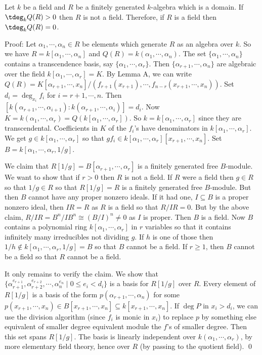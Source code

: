 \begin{lem}[Lemma B]
Let $k$ be a field and $R$ be a finitely generated $k$-algebra which is a domain. If $\tdeg_k Q(R)>0$ then $R$ is not a field. Therefore, if $R$ is a field then $\tdeg_k Q(R)=0$. 
\end{lem}

\noindent Proof: Let $\alpha_1,\cdots,\alpha_n \in R$ be elements which generate $R$ as an algebra over $k$. So we have $R=k[\alpha_1,\cdots,\alpha_n]$ and $Q(R)=k(\alpha_1,\cdots,\alpha_n)$. The set $\{\alpha_1,\cdots,\alpha_n\}$ contains a transcendence basis, say $\{\alpha_1,\cdots,\alpha_r\}$. Then $\{\alpha_{r+1},\cdots,\alpha_n\}$ are algebraic over the field $k[\alpha_1,\cdots,\alpha_r]=K$. By Lemma A, we can write $Q(R)=K[\alpha_{r+1},\cdots,x_n]/(f_{r+1}(x_{r+1}),\cdots,f_{n-r}(x_{r+1},\cdots,x_n))$. Set $d_i=\deg_{x_i} f_i$ for $i=r+1,\cdots,n$. Then $[k(\alpha_{r+1},\cdots,\alpha_{i+1}): k(\alpha_{r+1},\cdots,\alpha_i)]=d_i$. Now $K=k(\alpha_1,\cdots,\alpha_r)=Q(k[\alpha_1,\cdots,\alpha_r])$. So $k=k[\alpha_1,\cdots,\alpha_r]$ since they are transcendental. Coefficients in $K$ of the $f_i$'s have denominators in $k[\alpha_1,\cdots,\alpha_r]$. We get $g \in k[\alpha_1,\cdots,\alpha_r]$ so that $gf_i \in k[\alpha_1,\cdots,\alpha_r][x_{r+1},\cdots,x_n]$. Set $B=k[\alpha_1,\cdots,\alpha_r,1/g]$. 

We claim that $R[1/g]=B[\alpha_{r+1},\cdots,\alpha_r]$ is a finitely generated free $B$-module. We want to show that if $r>0$ then $R$ is not a field. If $R$ were a field then $g \in R$ so that $1/g \in R$ so that $R[1/g]=R$ is a finitely generated free $B$-module. But then $B$ cannot have any proper nonzero ideals. If it had one, $I \subseteq B$ is a proper nonzero ideal, then $IR=R$ as $R$ is a field so that $R/IR=0$. But by the above claim, $R/IR=B^n/IB^n \cong (B/I)^n \neq 0$ as $I$ is proper. Then $B$ is a field. Now $B$ contains a polynomial ring $k[\alpha_1,\cdots,\alpha_r]$ in $r$ variables so that it contains infinitely many irreducibles not dividing $g$. If $h$ is one of those then $1/h \notin k[\alpha_1,\cdots,\alpha_r,1/g]=B$ so that $B$ cannot be a field. If $r \geq 1$, then $B$ cannot be a field so that $R$ cannot be a field. 

It only remains to verify the claim. We show that $\{\alpha_{r+1}^{e_{r+1}},\alpha_{r+2}^{e_{r+2}},\cdots,\alpha_n^{e_n}\;|\; 0 \leq e_i<d_i\}$ is a basis for $R[1/g]$ over $R$. Every element of $R[1/g]$ is a basis of the form $p(\alpha_{r+1},\cdots,\alpha_n)$ for some $p(x_{r+1},\cdots,x_n) \in B[x_{r+1},\cdots,x_n] \subseteq k[x_{r+1},\cdots,x_n]$. If $\deg P$ in $x_i>d_i$, we can use the division algorithm (since $f_i$ is monic in $x_i$) to replace $p$ by something else equivalent of smaller degree equivalent module the $f$'s of smaller degree. Then this set spans $R[1/g]$. The basis is linearly independent over $k(\alpha_1,\cdots,\alpha_r)$, by more elementary field theory, hence over $R$ (by passing to the quotient field). \qed \\

